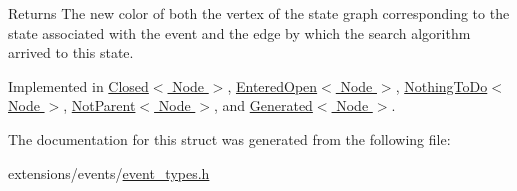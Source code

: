 \begin{DoxyReturn}{Returns}
The new color of both the vertex of the state graph corresponding to the state associated with the event and the edge by which the search algorithm arrived to this state. 
\end{DoxyReturn}


Implemented in \hyperlink{structClosed_a0cd2a0aa22be8c28e792d88b832952b7}{Closed$<$ Node $>$}, \hyperlink{structEnteredOpen_a3a0c0690450e47d69c8125a147918ab3}{Entered\+Open$<$ Node $>$}, \hyperlink{structNothingToDo_aedd48ed286603dac6b05f251532eeb62}{Nothing\+To\+Do$<$ Node $>$}, \hyperlink{structNotParent_a7d049b71da86e8f14a8ec644cd29dcd5}{Not\+Parent$<$ Node $>$}, and \hyperlink{structGenerated_a33e09cd8c34ffdf6e3f94717d02335fc}{Generated$<$ Node $>$}.



The documentation for this struct was generated from the following file\+:\begin{DoxyCompactItemize}
\item 
extensions/events/\hyperlink{event__types_8h}{event\+\_\+types.\+h}\end{DoxyCompactItemize}
